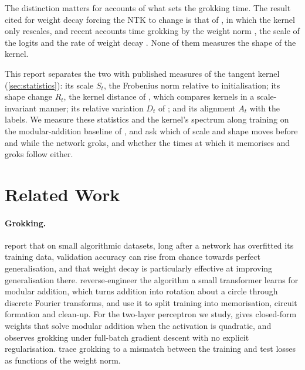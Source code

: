 \documentclass[a4paper,11pt]{article} %
\begin{document}
The distinction matters for accounts of what sets the grokking time. The result
cited for weight decay forcing the NTK to change
\citep{kumarGrokkingTransitionLazy2024} is that of
\citet{lewkowyczTrainingDynamicsDeep2021}, in which the kernel only rescales,
and recent accounts time grokking by the weight norm
\citep{khanhWeightNormSets2026}, the scale of the logits
\citep{khanhWhatDoesWeight2026} and the rate of weight decay
\citep{kimGrokkingWeightDecayClock2026}. None of them measures the shape of the
kernel.

This report separates the two with published measures of the tangent kernel
(\cref{sec:statistics}): its scale $S_t$, the Frobenius norm relative to
initialisation; its shape change $R_t$, the kernel distance of
\citet{fortDeepLearningKernel2020}, which compares kernels in a scale-invariant
manner; its relative variation $D_t$ of
\citet{geigerDisentanglingFeatureLazy2020}; and its alignment $A_t$ with the
labels. We measure these statistics and the kernel's spectrum along training on
the modular-addition baseline of
\citet{kumarGrokkingTransitionLazy2024}, and ask which of scale and shape moves
before and while the network groks, and whether the times at which it memorises
and groks follow either.

\section{Related Work}\label{sec:related}

\paragraph{Grokking.} 
report that on small algorithmic datasets, long after a network has overfitted
its training data, validation accuracy can rise from chance towards perfect
generalisation, and that weight decay is particularly effective at improving
generalisation there.  reverse-engineer
the algorithm a small transformer learns for modular addition, which turns
addition into rotation about a circle through discrete Fourier transforms, and
use it to split training into memorisation, circuit formation and clean-up.
For the two-layer perceptron we study,
\citet{gromovGrokkingModularArithmetic2023}
gives closed-form weights that solve modular addition when the activation is
quadratic, and observes grokking under full-batch gradient descent with no
explicit regularisation.  trace
grokking to a mismatch between the training and test losses as functions of
the weight norm.
\end{document}
